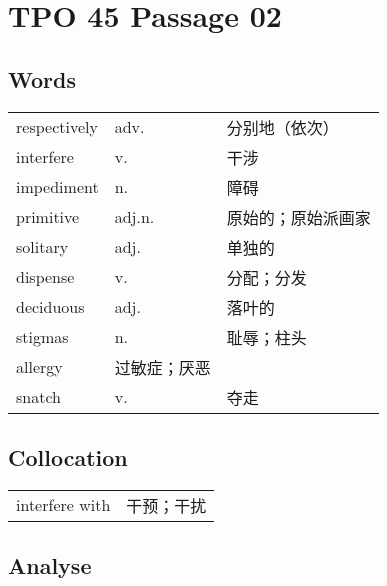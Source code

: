\section{TPO 45 Passage 02}

\subsection{Words}

\begin{tabular}{lll}
    respectively & adv.   & 分别地（依次）   \\
    interfere    & v.     & 干涉        \\
    impediment   & n.     & 障碍        \\
    primitive    & adj.n. & 原始的；原始派画家 \\
    solitary     & adj.   & 单独的       \\
    dispense     & v.     & 分配；分发     \\
    deciduous    & adj.   & 落叶的       \\
    stigmas      & n.     & 耻辱；柱头     \\
    allergy      & 过敏症；厌恶             \\
    snatch       & v.     & 夺走        \\
\end{tabular}

\subsection{Collocation}

\begin{tabular}{ll}
    interfere with & 干预；干扰 \\
\end{tabular}

\newpage

\subsection{Analyse}

